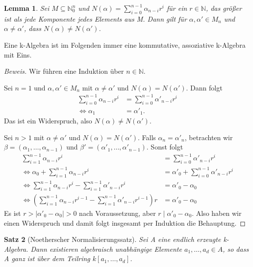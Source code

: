 \documentclass{article}
\newtheorem{satz}{Satz}
\newtheorem{lemma}[satz]{Lemma}
\begin{document}
	\begin{lemma}\label{tupelvergleich}
	Sei \(M \subseteq \mathbb{N}^n_0\) und \(N(\alpha) = \sum^{n-1}_{i=0}
	\alpha_{n-i}r^i\) für ein \(r \in \mathbb{N}\), das größer ist
	als jede Komponente jedes Elements aus M. Dann gilt für \(\alpha, \alpha'
	\in M_n\) und \(\alpha \neq \alpha'\), dass \(N(\alpha) \neq N(\alpha')\).
	\end{lemma}

	Eine k-Algebra ist im Folgenden immer eine kommutative, assoziative
	k-Algebra mit Eins.

	\begin{proof}[Beweis]
	Wir führen eine Induktion über \(n \in \mathbb{N}\).

	Sei \(n = 1\) und \(\alpha, \alpha' \in M_n\) mit \(\alpha \neq \alpha'\)
	und \(N(\alpha) = N(\alpha')\). Dann folgt
	\begin{align*} \sum^{n-1}_{i=0} \alpha_{n-i}r^i &= \sum^{n-1}_{i=0}
	\alpha'_{n-i}r^i \\ \Leftrightarrow \alpha_{1} &= \alpha'_{1}. \end{align*}
	Das ist ein Widerspruch, also \(N(\alpha) \neq N(\alpha')\).

	Sei \(n > 1\) mit \(\alpha \neq \alpha'\) und \(N(\alpha) = N(\alpha')\).
	Falls \(\alpha_n = \alpha'_n\), betrachten wir \(\beta = (\alpha_1,\ldots,
	\alpha_{n-1})\) und \(\beta' = (\alpha'_1,\ldots,\alpha'_{n-1})\).
	Sonst folgt
	\begin{align*} \sum^{n-1}_{i=1} \alpha_{n-i}r^i &= \sum^{n-1}_{i=0}
	\alpha'_{n-i}r^i \\
	\Leftrightarrow \alpha_0 + \sum^{n-1}_{i=1} \alpha_{n-i}r^i &=
	\alpha'_0 + \sum^{n-1}_{i=0} \alpha'_{n-i}r^i \\
	\Leftrightarrow \sum^{n-1}_{i=1} \alpha_{n-i}r^i - \sum^{n-1}_{i=1}
	\alpha'_{n-i}r^i &= \alpha'_0 - \alpha_0 \\
	\Leftrightarrow (\sum^{n-1}_{i=1} \alpha_{n-i}r^{i-1} - \sum^{n-1}_{i=1}
	\alpha'_{n-i}r^{i-1})r &= \alpha'_0 - \alpha_0
	\end{align*}
	Es ist \(r > |\alpha'_0 - \alpha_0| > 0\) nach Voraussetzung, aber
	\(r\;|\;\alpha'_0 - \alpha_0\). Also haben wir einen Widerspruch und damit
	folgt insgesamt per Induktion die Behauptung.
	\end{proof}

	\begin{satz}[Noetherscher Normalisierungssatz] \label{2.1.4}
	Sei A eine endlich erzeugte k-Algebra. Dann existieren algebraisch
	unabhängige Elemente \(a_1, \ldots, a_d \in A\), so dass A ganz ist über
	dem Teilring \(k[a_1, \ldots, a_d]\).
	\end{satz}
\end{document}

